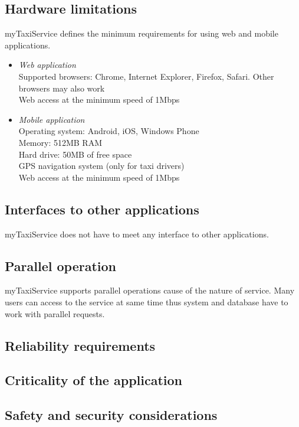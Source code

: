\subsection{Hardware limitations}
myTaxiService defines the minimum requirements for using web and mobile applications.
\begin{itemize}
\item \emph{Web application}\\
Supported browsers: Chrome, Internet Explorer, Firefox, Safari. Other browsers may also work\\
Web access at the minimum speed of 1Mbps
\item \emph{Mobile application}\\
Operating system: Android, iOS, Windows Phone\\
Memory: 512MB RAM\\
Hard drive: 50MB of free space\\
GPS navigation system (only for taxi drivers)\\
Web access at the minimum speed of 1Mbps
\end{itemize}

\subsection{Interfaces to other applications}
myTaxiService does not have to meet any interface to other applications.

\subsection{Parallel operation}
myTaxiService supports parallel operations cause of the nature of service. Many users can access to the service at same time thus system and database have to work with parallel requests.

\subsection{Reliability requirements}

\subsection{Criticality of the application}

\subsection{Safety and security considerations}
